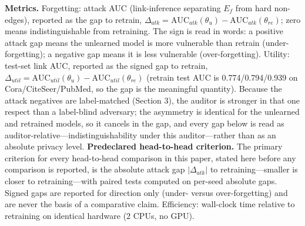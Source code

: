 \documentclass[pdflatex,sn-basic,Numbered]{sn-jnl}
\begin{document}
\textbf{Metrics.} Forgetting: attack AUC (link-inference separating $E_f$ from hard non-edges), reported as the gap to retrain, $\Delta_{atk} = \mathrm{AUC}_{atk}(\theta_u) - \mathrm{AUC}_{atk}(\theta_{re})$; zero means indistinguishable from retraining. The sign is read in words: a positive attack gap means the unlearned model is more vulnerable than retrain (under-forgetting); a negative gap means it is less vulnerable (over-forgetting). Utility: test-set link AUC, reported as the signed gap to retrain, $\Delta_{util} = \mathrm{AUC}_{util}(\theta_u) - \mathrm{AUC}_{util}(\theta_{re})$ (retrain test AUC is 0.774/0.794/0.939 on Cora/CiteSeer/PubMed, so the gap is the meaningful quantity). Because the attack negatives are label-matched (Section 3), the auditor is stronger in that one respect than a label-blind adversary; the asymmetry is identical for the unlearned and retrained models, so it cancels in the gap, and every gap below is read as auditor-relative---indistinguishability under this auditor---rather than as an absolute privacy level. \textbf{Predeclared head-to-head criterion.} The primary criterion for every head-to-head comparison in this paper, stated here before any comparison is reported, is the absolute attack gap $|\Delta_{atk}|$ to retraining---smaller is closer to retraining---with paired tests computed on per-seed absolute gaps. Signed gaps are reported for direction only (under- versus over-forgetting) and are never the basis of a comparative claim. Efficiency: wall-clock time relative to retraining on identical hardware (2 CPUs, no GPU).
\end{document}

